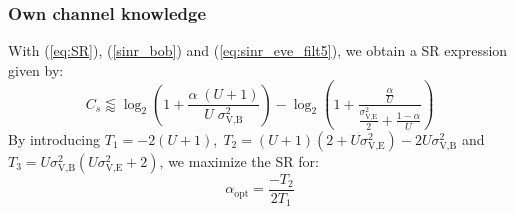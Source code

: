\documentclass[journal,comsoc]{IEEEtran}
\begin{document}
\subsubsection{Own channel knowledge}
With (\ref{eq:SR}), (\ref{sinr_bob}) and (\ref{eq:sinr_eve_filt5}), we obtain a SR expression given by:
\begin{equation}
C_s \lessapprox \log_2 \left( 1 +  \frac{\alpha \;(U+1)}{U \; \sigma_{\text{V,B}}^2} \right) - \log_2\left( 1 +  \frac{\frac{\alpha }{U}}{\frac{\sigma^2_{\text{V,E}}}{2} + \frac{1-\alpha}{U}}\right)
\label{eq:SR_anal2_decod_5}
\end{equation}
By introducing $T_1=-2(U+1),  \; T_2 = (U+1)(2+U\sigma_{\text{V,E}}^2) - 2U\sigma_{\text{V,B}}^2 $ and $T_3 = U\sigma_{\text{V,B}}^2(U\sigma_{\text{V,E}}^2+2)$, we maximize the SR for:
\begin{equation}
\alpha_{\text{opt}} = \frac{-T_2}{2T_1}
\label{eq:optimal_alpha_decod_5}
\end{equation}


\end{document}
